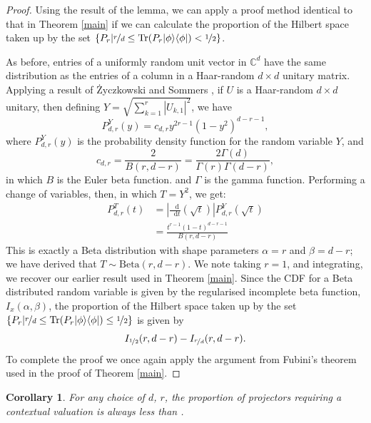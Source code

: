 \documentclass{amsart}
\newtheorem{cor}{Corollary}
\theoremstyle{definition}
\DeclareMathOperator{\tr}{Tr}
\newcommand{\ketbra}[1]{{\left\vert {#1}\middle\rangle\middle\langle{#1}\right\vert}}
\newcommand*\dif{\mathop{}\!\mathrm{d}}
\begin{document}
\begin{proof}
Using the result of the lemma, we can apply a proof method identical to that in Theorem \ref{main} if we can calculate the proportion of the Hilbert space taken up by the set $\left\{P_r\middle|\nicefrac{r}{d}\leq \tr(P_r\ketbra{\phi})<\nicefrac12\right\}$.

As before, entries of a uniformly random unit vector in $\mathbb{C}^d$ have the same distribution as the entries of a column in a Haar-random $d\times d$ unitary matrix. Applying a result of \.{Z}yczkowski and Sommers \cite{Zycz2000}, if $U$ is a Haar-random $d\times d$ unitary, then defining $Y=\sqrt{\sum_{k=1}^r\left|U_{k,1}\right|^2}$, we have
\begin{equation}
P^Y_{d,r}(y)=c_{d,r}y^{2r-1}(1-y^2)^{d-r-1},
\end{equation}
where $P^Y_{d,r}(y)$ is the probability density function for the random variable $Y$, and
\begin{equation}
c_{d,r}=\frac{2}{B\left(r,d-r\right)}=\frac{2\Gamma(d)}{\Gamma(r)\Gamma(d-r)},
\end{equation}
in which $B$ is the Euler beta function. and $\Gamma$ is the gamma function. Performing a change of variables, then, in which $T=Y^2$, we get: 
\begin{align}
P^T_{d,r}(t)&=\left|\frac{\dif}{\dif t}\left(\sqrt{t}\right)\right|P^Y_{d,r}\left(\sqrt{t}\right)\\
&=\frac{t^{r-1}\left(1-t\right)^{d-r-1}}{B(r,d-r)}
\end{align}
This is exactly a Beta distribution with shape parameters $\alpha=r$ and $\beta=d-r$; we have derived that $T\sim\mbox{Beta}(r,d-r)$. We note taking $r=1$, and integrating, we recover our earlier result used in Theorem \ref{main}. Since the CDF for a Beta distributed random variable is given by the regularised incomplete beta function, $I_x(\alpha,\beta)$, the proportion of the Hilbert space taken up by the set $\left\{P_r\middle|\nicefrac{r}{d}\leq \tr(P_r\ketbra{\phi})\leq\nicefrac12\right\}$ is given by
\begin{equation}
I_{\nicefrac{1}{2}}(r,d-r)-I_{\nicefrac{r}{d}}(r,d-r).
\end{equation}
To complete the proof we once again apply the argument from Fubini's theorem used in the proof of Theorem \ref{main}.
\end{proof}
\begin{cor}
For any choice of $d$, $r$, the proportion of projectors requiring a contextual valuation is always less than .
\end{cor}
\end{document}
